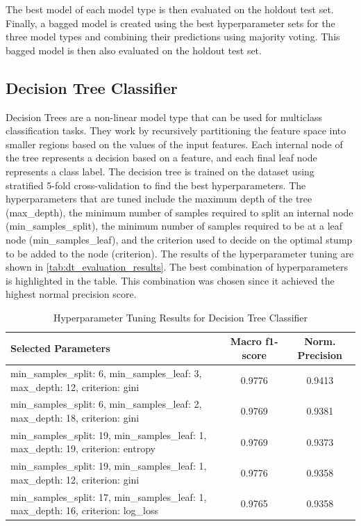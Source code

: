 The best model of each model type is then evaluated on the holdout test set. Finally, a bagged model is created using the best hyperparameter sets for the three model types and combining their predictions using majority voting. This bagged model is then also evaluated on the holdout test set.

\subsection{Decision Tree Classifier}
Decision Trees are a non-linear model type that can be used for multiclass classification tasks. They work by recursively partitioning the feature space into smaller regions based on the values of the input features. Each internal node of the tree represents a decision based on a feature, and each final leaf node represents a class label. The decision tree is trained on the dataset using stratified 5-fold cross-validation to find the best hyperparameters. The hyperparameters that are tuned include the maximum depth of the tree (max\_depth), the minimum number of samples required to split an internal node (min\_samples\_split), the minimum number of samples required to be at a leaf node (min\_samples\_leaf), and the criterion used to decide on the optimal stump to be added to the node (criterion). The results of the hyperparameter tuning are shown in \autoref{tab:dt_evaluation_results}. The best combination of hyperparameters is highlighted in the table. This combination was chosen since it achieved the highest normal precision score.

\begin{table}[htbp]
\caption{Hyperparameter Tuning Results for Decision Tree Classifier}
\label{tab:dt_evaluation_results}
\centering
\small
\begin{tabularx}{\linewidth}{>{\raggedright\arraybackslash}X c c}
\hline
\hline
\textbf{Selected Parameters} & \textbf{Macro f1-score} & \textbf{Norm. Precision} \\
\hline
\rowcolor{highlightRow}
min\_samples\_split: 6, min\_samples\_leaf: 3, max\_depth: 12, criterion: gini & 0.9776 & 0.9413 \\
min\_samples\_split: 6, min\_samples\_leaf: 2, max\_depth: 18, criterion: gini & 0.9769 & 0.9381 \\
min\_samples\_split: 19, min\_samples\_leaf: 1, max\_depth: 19, criterion: entropy & 0.9769 & 0.9373 \\
min\_samples\_split: 19, min\_samples\_leaf: 1, max\_depth: 12, criterion: gini & 0.9776 & 0.9358 \\
min\_samples\_split: 17, min\_samples\_leaf: 1, max\_depth: 16, criterion: log\_loss & 0.9765 & 0.9358 \\
\hline
\hline
\end{tabularx}
\end{table}


